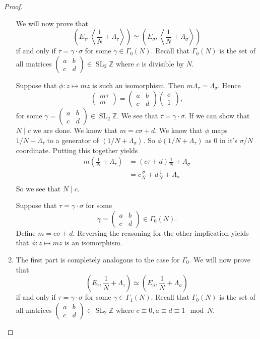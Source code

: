 \documentclass[titlepage,a4paper]{article}
\theoremstyle{theoremdd}
\theoremstyle{definitiondd}
\theoremstyle{remarkdd}
\newcommand{\Z}{\mathbb{Z}}
\newcommand{\ltr}{\par \noindent \framebox[1\width]{ $\implies$ } \hspace{.2cm}}
\newcommand{\rtl}{\par \noindent \framebox[1\width]{ $\impliedby$ } \hspace{.2cm} }
\DeclareMathOperator{\SL}{SL}
\begin{document}
\begin{proof}
\begin{enumerate}
	
	We will now prove that \[
		\left( E_\tau , \left<\frac{1}{N} + \Lambda_\tau \right> \right) \simeq 
		\left( E_\sigma, \left<\frac{1}{N} + \Lambda_\sigma \right> \right) 
	\]
	if and only if $\tau = \gamma \cdot \sigma$ for some $\gamma \in \Gamma_0(N)$.
	Recall that $\Gamma_0(N)$ is the set of all matrices $\begin{pmatrix} a & b \\ c & d \end{pmatrix} \in \SL_2\Z$ where $c$ is divisible by $N$. 
	\ltr Suppose that $\phi: z \mapsto m z$ is such an isomorphism. Then $m \Lambda_\tau = \Lambda_\sigma$. Hence \[
	\begin{pmatrix} m \tau \\ m \end{pmatrix}  = 
	\begin{pmatrix} a & b \\ c & d \end{pmatrix} \begin{pmatrix} \sigma \\ 1 \end{pmatrix} 
	,\] 
	for some $\gamma = \begin{pmatrix} a & b \\ c & d \end{pmatrix}  \in \SL_2\Z$. 
	We see that $\tau = \gamma \cdot \sigma$. If we can show that  $N \mathbin{\mid} c$ we are done.
	We know that $m = c \sigma + d$. 
	We know that $\phi$ maps $1 / N + \Lambda_\tau$ to a generator of $\left<1 / N + \Lambda_\sigma \right>$. 
	So $\phi( 1 / N + \Lambda_\tau)$ as $0$ in it's $\sigma / N$ coordinate.
	Putting this together yields \begin{align*}
		m\left(\frac{1}{N} + \Lambda_\tau\right) &= (c \tau + d) \frac{1}{N} + \Lambda_\sigma \\ 
		&= c \frac{\sigma}{N} + d \frac{1}{N} + \Lambda_\sigma \\
	\end{align*}
	So we see that $N \mathbin{|} c$. 
	\rtl Suppose that $\tau = \gamma \cdot \sigma$ for some \[
		\gamma = \begin{pmatrix} a & b \\ c & d  \end{pmatrix} \in \Gamma_0(N)
	.\] 
	Define  $m = c \sigma + d$. Reversing the reasoning for the other implication yields that  $\phi: z\mapsto  m z$ is an isomorphism. 

	\item The first part is completely analogous to the case for $\Gamma_0.$ 
	We will now prove that \[
		\left( E_\tau , \frac{1}{N} + \Lambda_\tau \right) \simeq 
		\left( E_\sigma, \frac{1}{N} + \Lambda_\sigma \right) 
	\]
	if and only if $\tau = \gamma \cdot \sigma$ for some $\gamma \in \Gamma_1(N)$.
	Recall that $\Gamma_0(N)$ is the set of all matrices $\begin{pmatrix} a & b \\ c & d \end{pmatrix} \in \SL_2\Z$ where $c \equiv 0, a \equiv d \equiv 1 \mod N$. 


\end{enumerate}
\end{proof}
\end{document}
